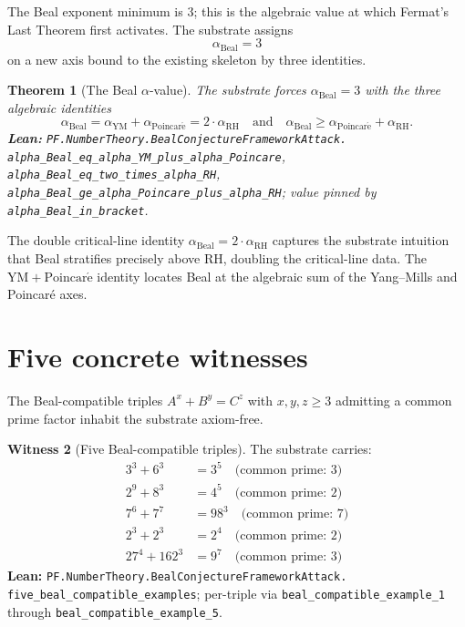 \documentclass[11pt,a4paper]{article}
\theoremstyle{plain}
\newtheorem{theorem}{Theorem}[section]
\theoremstyle{definition}
\newtheorem{witness}[theorem]{Witness}
\begin{document}
The Beal exponent minimum is $3$; this is the algebraic value at
which Fermat's Last Theorem first activates. The substrate assigns
\[
\alpha_{\mathrm{Beal}} = 3
\]
on a new axis bound to the existing skeleton by three identities.

\begin{theorem}[The Beal $\alpha$-value]
\label{thm:alpha-beal}
The substrate forces $\alpha_{\mathrm{Beal}} = 3$ with the three
algebraic identities
\[
\alpha_{\mathrm{Beal}}
= \alpha_{\mathrm{YM}} + \alpha_{\mathrm{Poincar\acute e}}
= 2 \cdot \alpha_{\mathrm{RH}}
\quad\text{and}\quad
\alpha_{\mathrm{Beal}} \ge \alpha_{\mathrm{Poincar\acute e}}
+ \alpha_{\mathrm{RH}}.
\]
\textbf{Lean:}
\texttt{PF.NumberTheory.BealConjectureFrameworkAttack.\\
alpha\_Beal\_eq\_alpha\_YM\_plus\_alpha\_Poincare},
\texttt{alpha\_Beal\_eq\_two\_times\_alpha\_RH},
\texttt{alpha\_Beal\_ge\_alpha\_Poincare\_plus\_alpha\_RH};
value pinned by \texttt{alpha\_Beal\_in\_bracket}.
\end{theorem}

The double critical-line identity $\alpha_{\mathrm{Beal}}
= 2 \cdot \alpha_{\mathrm{RH}}$ captures the substrate intuition
that Beal stratifies precisely above RH, doubling the critical-line
data. The $\mathrm{YM} + \mathrm{Poincar\acute e}$ identity locates
Beal at the algebraic sum of the Yang--Mills and Poincar\'e axes.

\section{Five concrete witnesses}

The Beal-compatible triples $A^{x} + B^{y} = C^{z}$ with $x,y,z \ge 3$
admitting a common prime factor inhabit the substrate axiom-free.

\begin{witness}[Five Beal-compatible triples]
\label{wit:five-beal}
The substrate carries:
\[
\begin{aligned}
3^{3} + 6^{3} &= 3^{5}\quad\text{(common prime: 3)} \\
2^{9} + 8^{3} &= 4^{5}\quad\text{(common prime: 2)} \\
7^{6} + 7^{7} &= 98^{3}\quad\text{(common prime: 7)} \\
2^{3} + 2^{3} &= 2^{4}\quad\text{(common prime: 2)} \\
27^{4} + 162^{3} &= 9^{7}\quad\text{(common prime: 3)}
\end{aligned}
\]
\textbf{Lean:}
\texttt{PF.NumberTheory.BealConjectureFrameworkAttack.\\
five\_beal\_compatible\_examples}; per-triple via
\texttt{beal\_compatible\_example\_1} through
\texttt{beal\_compatible\_example\_5}.
\end{witness}
\end{document}
